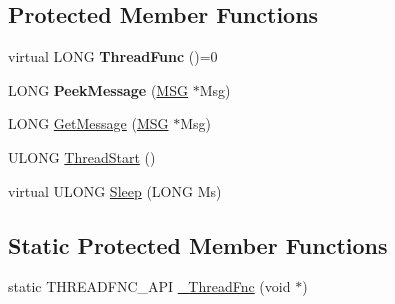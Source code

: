 \subsection*{Protected Member Functions}
\begin{DoxyCompactItemize}
\item 
\mbox{\label{class_canberra_1_1_utility_1_1_core_1_1_thread_a47113546f12ab4a5c64cea97314a9d4f}} 
virtual L\+O\+NG {\bfseries Thread\+Func} ()=0
\item 
\mbox{\label{class_canberra_1_1_utility_1_1_core_1_1_thread_a5376d59ab58c4fc44331a0d676d515a8}} 
L\+O\+NG {\bfseries Peek\+Message} (\hyperlink{struct___m_s_g}{M\+SG} $\ast$Msg)
\item 
L\+O\+NG \hyperlink{class_canberra_1_1_utility_1_1_core_1_1_thread_aa68aa652462d9dd2d48a7c953611bb53_aa68aa652462d9dd2d48a7c953611bb53}{Get\+Message} (\hyperlink{struct___m_s_g}{M\+SG} $\ast$Msg)
\item 
U\+L\+O\+NG \hyperlink{class_canberra_1_1_utility_1_1_core_1_1_thread_aa058eced991ed08cc84117d178d0df78_aa058eced991ed08cc84117d178d0df78}{Thread\+Start} ()
\item 
virtual U\+L\+O\+NG \hyperlink{class_canberra_1_1_utility_1_1_core_1_1_thread_a51843bf1ca6bff2e02d21042da2c9e76_a51843bf1ca6bff2e02d21042da2c9e76}{Sleep} (L\+O\+NG Ms)
\end{DoxyCompactItemize}
\subsection*{Static Protected Member Functions}
\begin{DoxyCompactItemize}
\item 
static T\+H\+R\+E\+A\+D\+F\+N\+C\+\_\+\+A\+PI \hyperlink{class_canberra_1_1_utility_1_1_core_1_1_thread_a04a1341b87d0e93138ca33b8f8b4447a_a04a1341b87d0e93138ca33b8f8b4447a}{\+\_\+\+Thread\+Fnc} (void $\ast$)
\end{DoxyCompactItemize}
